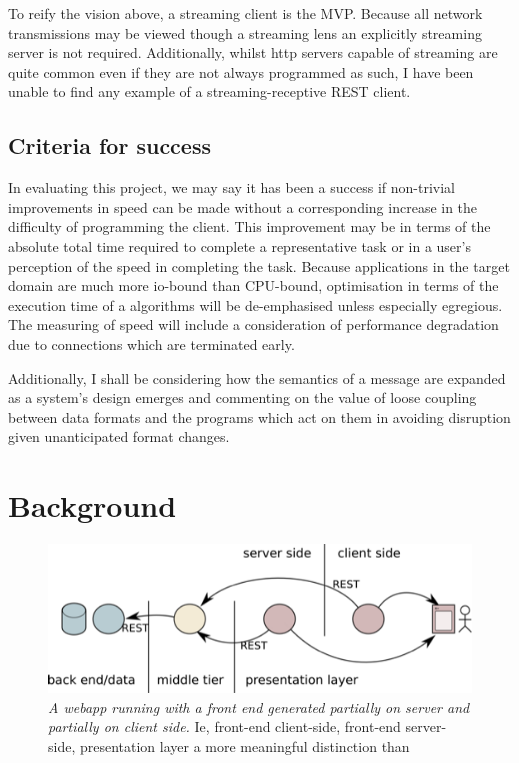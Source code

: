 \documentclass[]{article}
\makeatletter
\let\stdsection\section
\renewcommand\section{\newpage\stdsection}
\def\maxwidth{\ifdim\Gin@nat@width>\linewidth\linewidth
\else\Gin@nat@width\fi}
\let\Oldincludegraphics\includegraphics
\renewcommand{\includegraphics}[1]{\Oldincludegraphics[width=\maxwidth]{#1}}
\makeatother
\begin{document}
To reify the vision above, a streaming client is the MVP. Because all
network transmissions may be viewed though a streaming lens an
explicitly streaming server is not required. Additionally, whilst http
servers capable of streaming are quite common even if they are not
always programmed as such, I have been unable to find any example of a
streaming-receptive REST client.

\subsection{Criteria for success}

In evaluating this project, we may say it has been a success if
non-trivial improvements in speed can be made without a corresponding
increase in the difficulty of programming the client. This improvement
may be in terms of the absolute total time required to complete a
representative task or in a user's perception of the speed in completing
the task. Because applications in the target domain are much more
io-bound than CPU-bound, optimisation in terms of the execution time of
a algorithms will be de-emphasised unless especially egregious. The
measuring of speed will include a consideration of performance
degradation due to connections which are terminated early.

Additionally, I shall be considering how the semantics of a message are
expanded as a system's design emerges and commenting on the value of
loose coupling between data formats and the programs which act on them
in avoiding disruption given unanticipated format changes.

\section{Background}

\begin{figure}[htbp]
\centering
\includegraphics{images/architecture.png}
\caption{\emph{A webapp running with a front end generated partially on
server and partially on client side.} Ie, front-end client-side,
front-end server-side, presentation layer a more meaningful distinction
than}
\end{figure}
\end{document}
